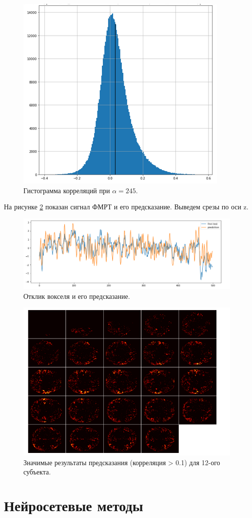 \documentclass[pdftex,ptm,12pt,a4paper]{report}
\theoremstyle{definition}
\begin{document}
\begin{figure}[h]
\includegraphics[scale=0.6]{graphics/sub3_prep2.png}
\centering
\caption{Гистограмма корреляций при $\alpha=245$.}
\label{sub3_hist}
\end{figure}

На рисунке \ref{sub3_bv} показан сигнал ФМРТ и его предсказание. Выведем срезы по оси z.

\begin{figure}[h]
\includegraphics[scale=0.5]{graphics/sub3_prep2_bestvoxel.png}
\centering
\caption{Отклик вокселя и его предсказание.}
\label{sub3_bv}
\end{figure}

\begin{figure}[h]
\includegraphics[scale=0.7]{graphics/sub12_trunk01.png}
\centering
\caption{Значимые результаты предсказания (корреляция > 0.1) для 12-ого субъекта.}
\label{sub12_mosaic}
\end{figure}


\section{Нейросетевые методы}





\end{document}
